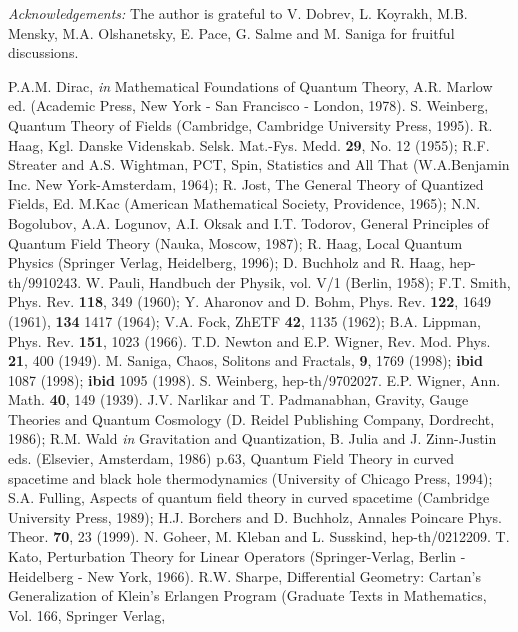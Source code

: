 \documentclass[a4paper,12pt]{article}%
\begin{document}
{\it Acknowledgements: } The author is grateful to 
V. Dobrev, L. Koyrakh, M.B. Mensky, M.A. Olshanetsky,
E. Pace, G. Salme and M. Saniga for fruitful discussions. 

\begin{thebibliography}{99}
 P.A.M. Dirac, {\it in} Mathematical Foundations of
Quantum Theory, A.R. Marlow ed. (Academic Press, New York -
San Francisco - London, 1978).
 S. Weinberg, Quantum Theory of Fields  
(Cambridge, Cambridge University Press, 1995).
 R. Haag, Kgl. Danske Videnskab. Selsk. Mat.-Fys. Medd.
{\bf 29}, No. 12  (1955); R.F. Streater and A.S. Wightman, 
PCT, Spin, Statistics and All That (W.A.Benjamin Inc. 
New York-Amsterdam, 1964);
R. Jost, The General Theory of Quantized Fields, Ed. M.Kac
(American Mathematical Society, Providence, 1965);
N.N. Bogolubov, A.A. Logunov, A.I. Oksak and I.T. Todorov,
General Principles of Quantum Field Theory (Nauka, Moscow, 1987);
R. Haag, Local Quantum Physics (Springer Verlag,
Heidelberg, 1996); D. Buchholz and R. Haag, hep-th/9910243.
 W. Pauli, Handbuch der Physik, vol. V/1
(Berlin, 1958); F.T. Smith, Phys. Rev. {\bf 118}, 349 (1960);
Y. Aharonov and D. Bohm, Phys. Rev. {\bf 122}, 1649 (1961),
{\bf 134} 1417 (1964); V.A. Fock, ZhETF {\bf 42}, 1135 (1962);
B.A. Lippman, Phys. Rev. {\bf 151}, 1023 (1966).
 T.D. Newton and E.P. Wigner, Rev. Mod. Phys.
{\bf 21}, 400 (1949). 
 M. Saniga, Chaos, Solitons and Fractals, 
{\bf 9}, 1769 (1998);  {\bf ibid} 1087 (1998); {\bf ibid}
1095 (1998).
 S. Weinberg, hep-th/9702027.
 E.P. Wigner, Ann. Math. {\bf 40}, 149 (1939).
 J.V. Narlikar and T. Padmanabhan,
Gravity, Gauge Theories and Quantum Cosmology (D. Reidel
Publishing Company, Dordrecht, 1986);
R.M. Wald {\it in} Gravitation and
Quantization, B. Julia and J. Zinn-Justin eds. (Elsevier,
Amsterdam, 1986) p.63, Quantum Field Theory in curved
spacetime and black hole thermodynamics (University of
Chicago Press, 1994);
S.A. Fulling, Aspects of quantum field
theory in curved spacetime (Cambridge University Press, 1989);
H.J. Borchers and D. Buchholz, Annales Poincare Phys.
Theor. {\bf 70}, 23 (1999).
 N. Goheer, M. Kleban and L. Susskind,
hep-th/0212209.
 T. Kato, Perturbation Theory for Linear
Operators (Springer-Verlag, Berlin - Heidelberg - New York,
1966). 
 R.W. Sharpe, Differential Geometry: Cartan's
Generalization of Klein's Erlangen Program (Graduate Texts
in Mathematics, Vol. 166, Springer Verlag, 

\end{thebibliography}
\end{document}
